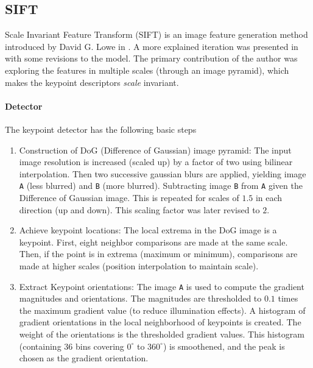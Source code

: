 
\subsection{SIFT}

Scale Invariant Feature Transform (SIFT) is an image feature generation method introduced by David G. Lowe in \cite{sift-original-lowe}. A more explained iteration was presented in \cite{sift-detailed-lowe} with some revisions to the model. The primary contribution of the author was exploring the features in multiple scales (through an image pyramid), which makes the keypoint descriptors \emph{scale} invariant.

\paragraph*{Detector}

The keypoint detector has the following basic steps

\begin{enumerate}
    \item Construction of DoG (Difference of Gaussian) image pyramid: The input image resolution is increased (scaled up) by a factor of two using bilinear interpolation.
    Then two successive gaussian blurs are applied, yielding image \texttt{A} (less blurred) and \texttt{B} (more blurred).
    Subtracting image \texttt{B} from \texttt{A} given the Difference of Gaussian image.
    This is repeated for scales of $1.5$ in each direction (up and down). This scaling factor was later revised to $2$.

    \item Achieve keypoint locations: The local extrema in the DoG image is a keypoint. 
    First, eight neighbor comparisons are made at the same scale. 
    Then, if the point is in extrema (maximum or minimum), comparisons are made at higher scales (position interpolation to maintain scale).
    
    \item Extract Keypoint orientations: The image \texttt{A} is used to compute the gradient magnitudes and orientations. The magnitudes are thresholded to $0.1$ times the maximum gradient value (to reduce illumination effects).
    A histogram of gradient orientations in the local neighborhood of keypoints is created. The weight of the orientations is the thresholded gradient values.
    This histogram (containing $36$ bins covering $0^\circ$ to $360^\circ$) is smoothened, and the peak is chosen as the gradient orientation.
\end{enumerate}

